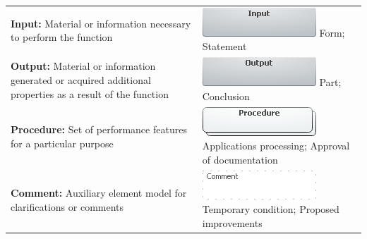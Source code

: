 \documentclass[]{book}
\begin{document}
\begin{longtable}[]{@{}ll@{}}
\begin{minipage}[t]{0.46\columnwidth}
\textbf{Input:} Material or information necessary to perform the function\strut
\end{minipage} & \begin{minipage}[t]{0.48\columnwidth}\raggedright
\includegraphics{images/input.png} \newline Form; Statement\strut
\end{minipage}\tabularnewline
\begin{minipage}[t]{0.46\columnwidth}\raggedright
\textbf{Output:} Material or information generated or acquired additional properties as a result of the function\strut
\end{minipage} & \begin{minipage}[t]{0.48\columnwidth}\raggedright
\includegraphics{images/output.png} \newline  Part; Conclusion\strut
\end{minipage}\tabularnewline
\begin{minipage}[t]{0.46\columnwidth}\raggedright
\textbf{Procedure:} Set of performance features for a particular purpose\strut
\end{minipage} & \begin{minipage}[t]{0.48\columnwidth}\raggedright
\includegraphics{images/procedure.png} \newline Applications processing; Approval of documentation\strut
\end{minipage}\tabularnewline
\begin{minipage}[t]{0.46\columnwidth}\raggedright
\textbf{Comment:} Auxiliary element model for clarifications or comments\strut
\end{minipage} & \begin{minipage}[t]{0.48\columnwidth}\raggedright
\includegraphics{images/comment.png} \newline     Temporary condition; Proposed improvements\strut
\end{minipage}\tabularnewline
\bottomrule
\end{longtable}
\end{document}
